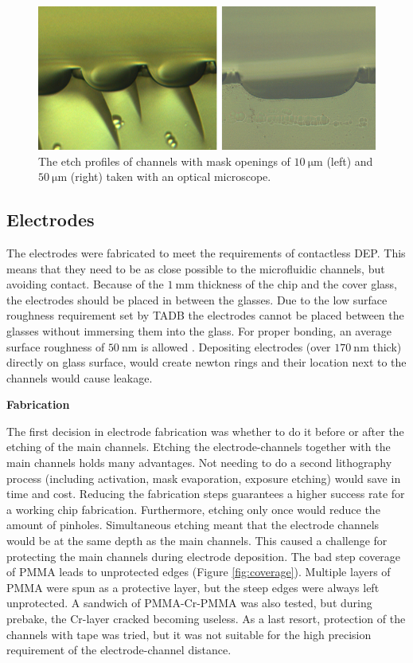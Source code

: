 \documentclass[final]{jyflluk}
\begin{document}
\begin{figure}[!h]
    \centering
    \includegraphics[width=1.0\textwidth]{optical/sideetch.png}
    \caption{The etch profiles of channels with mask openings of $\SI{10}{\micro \metre}$ (left) and $\SI{50}{\micro \metre}$ (right) taken with an optical microscope.}
    \label{fig:sideetch}
\end{figure}

\subsection{Electrodes}
\label{sec:xxx4}

The electrodes were fabricated to meet the requirements of contactless DEP. This means that they need to be as close possible to the microfluidic channels, but avoiding contact. Because of the $\SI{1}{\milli \metre}$ thickness of the chip and the cover glass, the electrodes should be placed in between the glasses. Due to the low surface roughness requirement set by TADB the electrodes cannot be placed between the glasses without immersing them into the glass. For proper bonding, an average surface roughness of $\SI{50}{\nano \metre}$ is allowed \cite{chen2009thermal}. Depositing electrodes (over $\SI{170}{\nano \metre}$ thick) directly on glass surface, would create newton rings and their location next to the channels would cause leakage. 

\begin{flushleft}\textbf{Fabrication} \end{flushleft}
The first decision in electrode fabrication was whether to do it before or after the etching of the main channels. Etching the electrode-channels together with the main channels holds many advantages. Not needing to do a second lithography process (including activation, mask evaporation, exposure etching) would save in time and cost. Reducing the fabrication steps guarantees a higher success rate for a working chip fabrication. Furthermore, etching only once would reduce the amount of pinholes. Simultaneous etching meant that the electrode channels would be at the same depth as the main channels. This caused a challenge for protecting the main channels during electrode deposition. The bad step coverage of PMMA leads to unprotected edges (Figure \ref{fig:coverage}). Multiple layers of PMMA were spun as a protective layer, but the steep edges were always left unprotected. A sandwich of PMMA-Cr-PMMA was also tested, but during prebake, the Cr-layer cracked becoming useless. As a last resort, protection of the channels with tape was tried, but it was not suitable for the high precision requirement of the electrode-channel distance.
\end{document}
